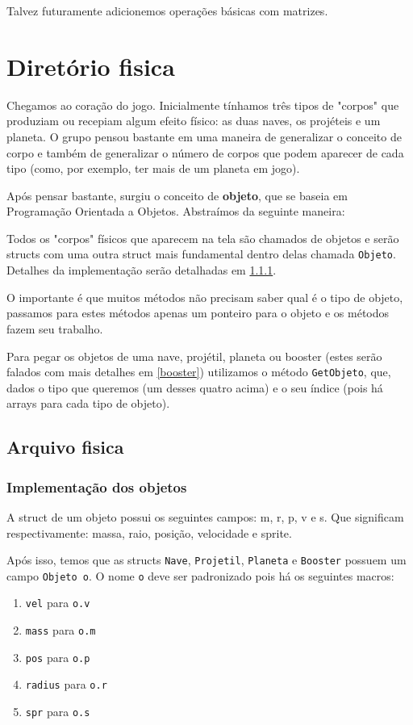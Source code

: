 \documentclass[12pt, a4paper]{article}
\begin{document}
        Talvez futuramente adicionemos operações básicas com matrizes.

    \newpage

    \section{Diretório fisica}
    
    Chegamos ao coração do jogo. Inicialmente tínhamos três tipos de "corpos"
    que produziam ou recepiam algum efeito físico: as duas naves, os projéteis
    e um planeta. O grupo pensou bastante em uma maneira de generalizar o conceito
    de corpo e também de generalizar o número de corpos que podem aparecer de cada
    tipo (como, por exemplo, ter mais de um planeta em jogo).

    Após pensar bastante, surgiu o conceito de \textbf{objeto}, que se baseia
    em Programação Orientada a Objetos. Abstraímos da seguinte maneira:

    Todos os "corpos" físicos que aparecem na tela são chamados de objetos e
    serão structs com uma outra struct mais fundamental dentro delas chamada
    \texttt{Objeto}. Detalhes da implementação serão detalhadas em \ref{obj}.

    O importante é que muitos métodos não precisam saber qual é o tipo de
    objeto, passamos para estes métodos apenas um ponteiro para o objeto 
    e os métodos fazem seu trabalho.

    Para pegar os objetos de uma nave, projétil, planeta ou booster 
    (estes serão falados com mais detalhes em \ref{booster}) utilizamos 
    o método \texttt{GetObjeto}, que, dados o tipo que queremos 
    (um desses quatro acima) e o seu índice 
    (pois há arrays para cada tipo de objeto).
    
    \subsection{Arquivo fisica}
    \label{fis}

    \subsubsection{Implementação dos objetos}
    \label{obj}

    A struct de um objeto possui os seguintes campos: m, r, p, v e s. Que
    significam respectivamente: massa, raio, posição, velocidade e sprite.
    
    Após isso, temos que as structs \texttt{Nave}, \texttt{Projetil},
    \texttt{Planeta} e \texttt{Booster} possuem um campo \texttt{Objeto o}.
    O nome \texttt{o} deve ser padronizado pois há os seguintes macros:
    \begin{enumerate}
        \item \texttt{vel} para \texttt{o.v}
        \item \texttt{mass} para \texttt{o.m}
        \item \texttt{pos} para \texttt{o.p}
        \item \texttt{radius} para \texttt{o.r}
        \item \texttt{spr} para \texttt{o.s}
    \end{enumerate}
\end{document}
